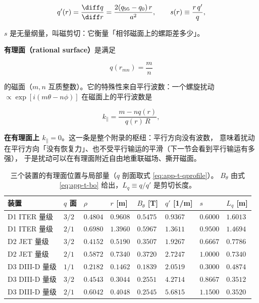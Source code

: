 \begin{equation}
q'(r)=\frac{\diff q}{\diff r}=\frac{2(q_{95}-q_0)\,r}{a^2},
\qquad
s(r)\equiv\frac{r\,q'}{q},
\label{eq:app-t-shear}
\end{equation}

$s$ 是无量纲量，叫磁剪切：它衡量「相邻磁面上的螺距差多少」。

\textbf{有理面（rational surface）}是满足

\begin{equation}
q(r_{mn})=\frac{m}{n}
\label{eq:app-t-resonance}
\end{equation}

的磁面（$m,n$ 互质整数）。它的特殊性来自平行波数：一个螺旋扰动
$\propto\exp[i(m\theta-n\phi)]$ 在磁面上的平行波数是

\begin{equation}
k_\parallel=\frac{m-nq(r)}{q(r)\,R},
\label{eq:app-t-kpar}
\end{equation}

\textbf{在有理面上 $k_\parallel=0$}。这一条是整个附录的枢纽：平行方向没有波数，
意味着扰动在平行方向「没有恢复力」、也不受平行输运的平滑（下一节会看到平行输运有多强），
于是扰动可以在有理面附近自由地重联磁场、撕开磁面。

\begin{table}[htbp]
  \centering
  \caption{三个装置的有理面位置与局部量（$q$ 剖面取式 \eqref{eq:app-t-qprofile}）。
    $B_\theta$ 由式 \eqref{eq:app-t-bo} 给出，$L_q\equiv q/q'$ 是剪切长度。}
  \label{tab:app-t-surfaces}
  \begin{tabular}{@{}p{3.0cm}p{1.4cm}p{1.5cm}p{1.5cm}p{1.6cm}p{1.6cm}p{1.4cm}p{1.5cm}@{}}
    \toprule
    装置 & $q$ 面 & $\rho$ & $r$ [m] & $B_\theta$ [T] & $q'$ [1/m] & $s$ & $L_q$ [m] \\
    \midrule
    D1 ITER 量级 & $3/2$ & $0.4804$ & $0.9608$ & $0.5475$ & $0.9367$ & $0.6000$ & $1.6013$ \\
    D1 ITER 量级 & $2/1$ & $0.6980$ & $1.3960$ & $0.5967$ & $1.3611$ & $0.9500$ & $1.4694$ \\
    D2 JET 量级 & $3/2$ & $0.4152$ & $0.5190$ & $0.3507$ & $1.9267$ & $0.6667$ & $0.7786$ \\
    D2 JET 量级 & $2/1$ & $0.5872$ & $0.7340$ & $0.3720$ & $2.7247$ & $1.0000$ & $0.7340$ \\
    D3 DIII-D 量级 & $1/1$ & $0.2182$ & $0.1462$ & $0.1839$ & $2.0519$ & $0.3000$ & $0.4874$ \\
    D3 DIII-D 量级 & $3/2$ & $0.4543$ & $0.3044$ & $0.2551$ & $4.2714$ & $0.8667$ & $0.3512$ \\
    D3 DIII-D 量级 & $2/1$ & $0.6042$ & $0.4048$ & $0.2545$ & $5.6815$ & $1.1500$ & $0.3520$ \\
    \bottomrule
  \end{tabular}
\end{table}

